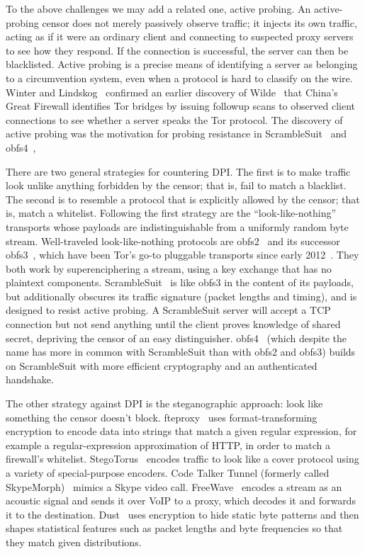 \documentclass[conference]{IEEEtran}
\begin{document}
To the above challenges we may add a related one, active probing.
An active-probing censor does not merely passively observe traffic;
it injects its own traffic,
acting as if it were an ordinary client and connecting to suspected
proxy servers to see how they respond.
If the connection is successful, the server can then be blacklisted.
Active probing is a precise means of identifying a server as belonging to a circumvention system,
even when a protocol is hard to classify on the wire.
Winter and Lindskog~\cite{foci12-winter} confirmed an earlier discovery of
Wilde~\cite{wilde} that China's Great Firewall identifies Tor bridges
by issuing followup scans to observed client connections to see
whether a server speaks the Tor protocol.
The discovery of active probing was the motivation for probing resistance in ScrambleSuit~\cite{scramblesuit}
and obfs4~\cite{obfs4},


There are two general strategies for countering DPI.
The first is to make traffic look unlike
anything forbidden by the censor; that is, fail to match a blacklist. The second is
to resemble a protocol that is explicitly allowed by the censor; that is, match a whitelist.
Following the first strategy are the ``look-like-nothing'' transports whose
payloads are indistinguishable from a uniformly random byte stream.
Well-traveled look-like-nothing
protocols are obfs2~\cite{obfs2} and its successor obfs3~\cite{obfs3},
which have been Tor's go-to pluggable transports since early 2012~\cite{obfsproxy-arms-race}.
They both work by superenciphering a stream, using a key exchange that has no plaintext components.
ScrambleSuit~\cite{scramblesuit} is like obfs3 in the
content of its payloads, but additionally obscures its traffic signature
(packet lengths and timing), and is designed to resist active probing.
A ScrambleSuit server will accept a TCP connection but not send anything
until the client proves knowledge of shared secret, depriving the censor
of an easy distinguisher.
obfs4~\cite{obfs4}
(which despite the name has more in common with ScrambleSuit than with obfs2 and obfs3)
builds on ScrambleSuit with more efficient cryptography and an authenticated handshake.

The other strategy against DPI is the steganographic approach: look like
something the censor doesn't block.
fteproxy~\cite{fte} uses format-transforming encryption to encode data into strings
that match a given regular expression,
for example a regular-expression approximation of HTTP,
in order to match a firewall's whitelist.
StegoTorus~\cite{stegotorus}
encodes traffic to look like a cover protocol
using a variety of special-purpose encoders.
Code Talker
Tunnel (formerly called SkypeMorph)~\cite{skypemorph} mimics a Skype video call.
FreeWave~\cite{freewave} encodes a stream as an acoustic signal
and sends it over VoIP to a proxy, which decodes it and forwards it to the destination.
Dust~\cite{dust} uses encryption to hide static byte patterns and then
shapes statistical features such as packet lengths and byte frequencies so that they
match given distributions.
\end{document}
